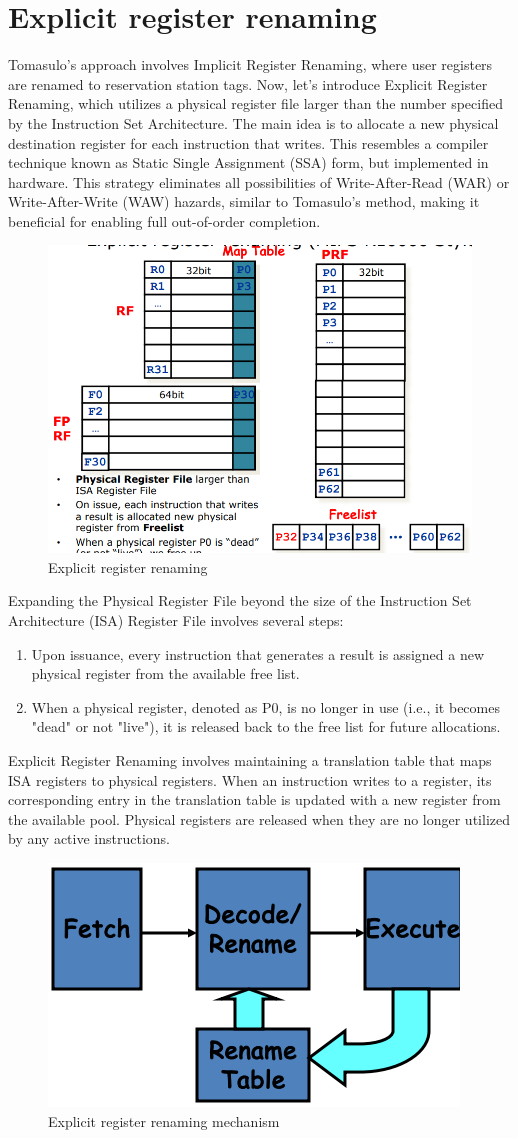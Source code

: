 \section{Explicit register renaming}

Tomasulo's approach involves Implicit Register Renaming, where user registers are renamed to reservation station tags. 
Now, let's introduce Explicit Register Renaming, which utilizes a physical register file larger than the number specified by the Instruction Set Architecture. 
The main idea is to allocate a new physical destination register for each instruction that writes. 
This resembles a compiler technique known as Static Single Assignment (SSA) form, but implemented in hardware. 
This strategy eliminates all possibilities of Write-After-Read (WAR) or Write-After-Write (WAW) hazards, similar to Tomasulo's method, making it beneficial for enabling full out-of-order completion.
\begin{figure}[H]
    \centering
    \includegraphics[width=0.4\linewidth]{images/err.png}
    \caption{Explicit register renaming}
\end{figure}
Expanding the Physical Register File beyond the size of the Instruction Set Architecture (ISA) Register File involves several steps:
\begin{enumerate}
    \item Upon issuance, every instruction that generates a result is assigned a new physical register from the available free list.
    \item  When a physical register, denoted as P0, is no longer in use (i.e., it becomes "dead" or not "live"), it is released back to the free list for future allocations.
\end{enumerate}
Explicit Register Renaming involves maintaining a translation table that maps ISA registers to physical registers. 
When an instruction writes to a register, its corresponding entry in the translation table is updated with a new register from the available pool. 
Physical registers are released when they are no longer utilized by any active instructions.
\begin{figure}[H]
    \centering
    \includegraphics[width=0.4\linewidth]{images/errm.png}
    \caption{Explicit register renaming mechanism}
\end{figure}

